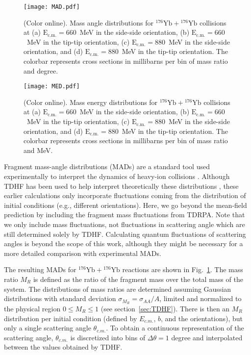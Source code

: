 \documentclass[reprint,aps,prc,twocolumn,superscriptaddress,floatfix,10pt]{revtex4-2}
\begin{document}
\begin{figure}[!htb]
	\texttt{[image: MAD.pdf]}
	\caption{\protect(Color online). Mass angle distributions for $^{176}\mathrm{Yb}+{}^{176}\mathrm{Yb}$ collisions at (a) $\mathrm{E_{c.m.}}=660$~MeV in the side-side orientation, (b) $\mathrm{E_{c.m.}}=660$~MeV in the tip-tip orientation, (c) $\mathrm{E_{c.m.}}=880$~MeV in the side-side orientation, and (d) $\mathrm{E_{c.m.}}=880$~MeV in the tip-tip orientation. The colorbar represents cross sections in millibarns per bin of mass ratio and degree.}
	\label{fig:mad}
\end{figure}

\begin{figure}[!htb]
	\texttt{[image: MED.pdf]}
	\caption{\protect(Color online). Mass energy distributions for $^{176}\mathrm{Yb}+{}^{176}\mathrm{Yb}$ collisions at (a) $\mathrm{E_{c.m.}}=660$~MeV in the side-side orientation, (b) $\mathrm{E_{c.m.}}=660$~MeV in the tip-tip orientation, (c) $\mathrm{E_{c.m.}}=880$~MeV in the side-side orientation, and (d) $\mathrm{E_{c.m.}}=880$~MeV in the tip-tip orientation. The colorbar represents cross sections in millibarns per bin of mass ratio and MeV.}
	\label{fig:med}
\end{figure}

Fragment mass-angle distributions (MADs) are a standard tool used experimentally to interpret the dynamics of heavy-ion collisions \cite{toke1985,shen1987,hinde2008,simenel2012b,durietz2013,wakhle2014,hammerton2015,morjean2017,mohanto2018,hinde2018}.
Although TDHF has been used to help interpret theoretically these distributions \cite{wakhle2014,hammerton2015,umar2016,sekizawa2016}, 
these earlier calculations only incorporate fluctuations coming from the distribution of initial conditions (e.g., different orientations). 
Here, we go beyond the mean-field prediction by including the fragment mass fluctuations from TDRPA.
Note that we only include mass fluctuations, not fluctuations in scattering angle which are still determined solely by TDHF. 
Calculating quantum fluctuations of scattering angles is beyond the scope of this work, although they might be necessary for a more detailed comparison with experimental MADs.

The resulting MADs for $^{176}\mathrm{Yb}+{}^{176}\mathrm{Yb}$ reactions are shown in Fig.~\ref{fig:mad}.
The mass ratio $M_R$ is defined as the ratio of the fragment mass over the total mass of the system. 
The distributions of mass ratios are determined assuming Gaussian distributions with standard deviation $\sigma_{M_R}=\sigma_{AA}/A$, limited and normalized to the physical region $0\le M_R\le1$ (see section~\ref{sec:TDHF}). 
There is then an $M_R$ distribution per initial condition (defined by $E_{c.m.}$, $b$, and the orientations), but only a single scattering angle $\theta_{c.m.}$.
To obtain a continuous representation of the scattering angle, $\theta_{c.m.}$ is discretized into bins of $\Delta\theta=1$ degree and interpolated between the values obtained by TDHF.
\end{document}
